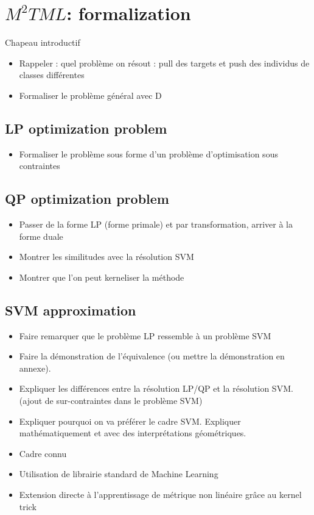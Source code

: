 \chapter{$M^2TML$: formalization}
\label{sec:unchapitre}
\minitoc

\noindent Chapeau introductif
\begin{itemize}
	\item Rappeler : quel problème on résout : pull des targets et push des individus de classes différentes
	\item Formaliser le problème général avec D
\end{itemize}

\section{LP optimization problem}
\begin{itemize}
	\item Formaliser le problème sous forme d'un problème d'optimisation sous contraintes
\end{itemize}

\section{QP optimization problem}
\begin{itemize}
	\item Passer de la forme LP (forme primale) et par transformation, arriver à la forme duale
	\item Montrer les similitudes avec la résolution SVM
	\item Montrer que l'on peut kerneliser la méthode
\end{itemize}


\section{SVM approximation}
\begin{itemize}
	\item Faire remarquer que le problème LP ressemble à un problème SVM
	\item Faire la démonstration de l'équivalence (ou mettre la démonstration en annexe).
	\item Expliquer les différences entre la résolution LP/QP et la résolution SVM. (ajout de sur-contraintes dans le problème SVM)
	\item Expliquer pourquoi on va préférer le cadre SVM. Expliquer mathématiquement et avec des interprétations géométriques. 
	\item Cadre connu
	\item Utilisation de librairie standard de Machine Learning
	\item Extension directe à l'apprentissage de métrique non linéaire grâce au kernel trick
\end{itemize}

